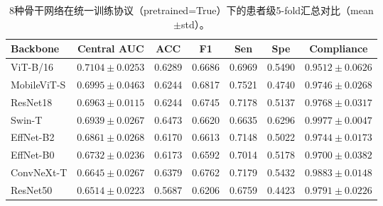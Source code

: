 \begin{table}[H]
\centering
\caption{8种骨干网络在统一训练协议（pretrained=True）下的患者级5-fold汇总对比（mean$\pm$std）。}
\small
\begin{tabular}{lcccccc}
\toprule
Backbone & Central AUC & ACC & F1 & Sen & Spe & Compliance \\
\midrule
ViT-B/16 & \textbf{$0.7104\pm0.0253$} & 0.6289 & 0.6686 & 0.6969 & 0.5490 & $0.9512\pm0.0626$ \\
MobileViT-S & $0.6995\pm0.0463$ & 0.6244 & 0.6817 & 0.7521 & 0.4740 & $0.9746\pm0.0268$ \\
ResNet18 & $0.6963\pm0.0115$ & 0.6244 & 0.6745 & 0.7178 & 0.5137 & $0.9768\pm0.0317$ \\
Swin-T & $0.6939\pm0.0267$ & 0.6473 & 0.6620 & 0.6635 & 0.6296 & \textbf{$0.9977\pm0.0047$} \\
EffNet-B2 & $0.6861\pm0.0268$ & 0.6170 & 0.6613 & 0.7148 & 0.5022 & $0.9744\pm0.0173$ \\
EffNet-B0 & $0.6732\pm0.0236$ & 0.6173 & 0.6592 & 0.7014 & 0.5178 & $0.9700\pm0.0382$ \\
ConvNeXt-T & $0.6645\pm0.0267$ & 0.6379 & 0.6762 & 0.7179 & 0.5432 & $0.9883\pm0.0148$ \\
ResNet50 & $0.6514\pm0.0223$ & 0.5687 & 0.6206 & 0.6759 & 0.4423 & $0.9791\pm0.0226$ \\
\bottomrule
\end{tabular}
\end{table}